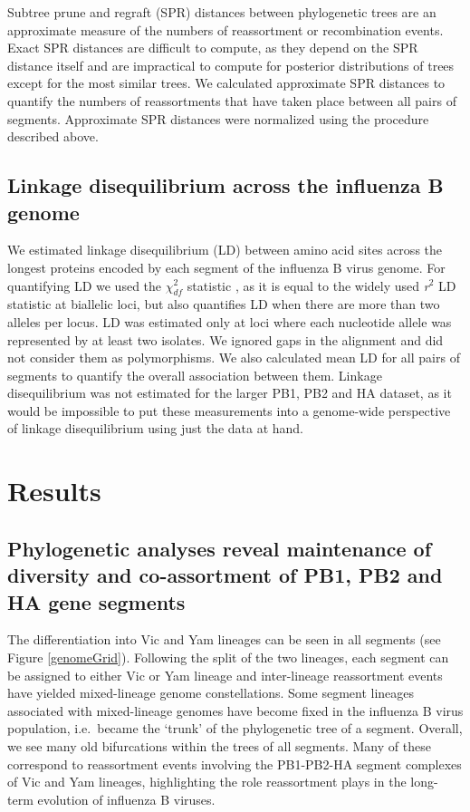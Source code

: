 \documentclass[11pt,oneside,letterpaper]{article}
\begin{document}
Subtree prune and regraft (SPR) distances between phylogenetic trees are an approximate measure of the numbers of reassortment or recombination events.
Exact SPR distances are difficult to compute, as they depend on the SPR distance itself and are impractical to compute for posterior distributions of trees except for the most similar trees.
We calculated approximate SPR distances \cite{whidden2009,whidden2010,whidden2013} to quantify the numbers of reassortments that have taken place between all pairs of segments.
Approximate SPR distances were normalized using the procedure described above.

\subsection*{Linkage disequilibrium across the influenza B genome}
We estimated linkage disequilibrium (LD) between amino acid sites across the longest proteins encoded by each segment of the influenza B virus genome.
For quantifying LD we used the $\chi^{2}_{df}$ statistic \cite{zhao2005}, as it is equal to the widely used \textit{r$^{2}$} LD statistic at biallelic loci, but also quantifies LD when there are more than two alleles per locus.
LD was estimated only at loci where each nucleotide allele was represented by at least two isolates.
We ignored gaps in the alignment and did not consider them as polymorphisms.
We also calculated mean LD for all pairs of segments to quantify the overall association between them.
Linkage disequilibrium was not estimated for the larger PB1, PB2 and HA dataset, as it would be impossible to put these measurements into a genome-wide perspective of linkage disequilibrium using just the data at hand.

\section*{Results}

\subsection*{Phylogenetic analyses reveal maintenance of diversity and co-assortment of PB1, PB2 and HA gene segments}
The differentiation into Vic and Yam lineages can be seen in all segments \cite{chen2008} (see Figure \ref{genomeGrid}).
Following the split of the two lineages, each segment can be assigned to either Vic or Yam lineage and inter-lineage reassortment events have yielded mixed-lineage genome constellations.
Some segment lineages associated with mixed-lineage genomes have become fixed in the influenza B virus population, i.e.\ became the `trunk' of the phylogenetic tree of a segment.
Overall, we see many old bifurcations within the trees of all segments.
Many of these correspond to reassortment events involving the PB1-PB2-HA segment complexes of Vic and Yam lineages, highlighting the role reassortment plays in the long-term evolution of influenza B viruses.
\end{document}
